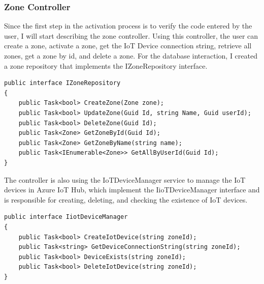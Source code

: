 \subsubsection{Zone Controller}
Since the first step in the activation process is to verify the code entered by the
user, I will start describing the zone controller.
Using this controller, the user can create a zone, activate a zone, get the IoT Device connection string, retrieve
all zones, get a zone by id, and delete a zone. For the database interaction, I created
a zone repository that implements the IZoneRepository interface.
\begin{lstlisting}[caption={Zone Repository interface}]
public interface IZoneRepository
{
    public Task<bool> CreateZone(Zone zone);
    public Task<bool> UpdateZone(Guid Id, string Name, Guid userId);
    public Task<bool> DeleteZone(Guid Id);
    public Task<Zone> GetZoneById(Guid Id);
    public Task<Zone> GetZoneByName(string name);
    public Task<IEnumerable<Zone>> GetAllByUserId(Guid Id);
}
\end{lstlisting}

The controller is also using the IoTDeviceManager service to manage the
IoT devices in Azure IoT Hub, which implement the IioTDeviceManager interface and 
is responsible for creating, deleting, and checking the existence of IoT devices.

\begin{lstlisting}[caption={IoT Device manager interface}]
public interface IiotDeviceManager
{
    public Task<bool> CreateIotDevice(string zoneId);
    public Task<string> GetDeviceConnectionString(string zoneId);
    public Task<bool> DeviceExists(string zoneId);
    public Task<bool> DeleteIotDevice(string zoneId);
}
\end{lstlisting}

